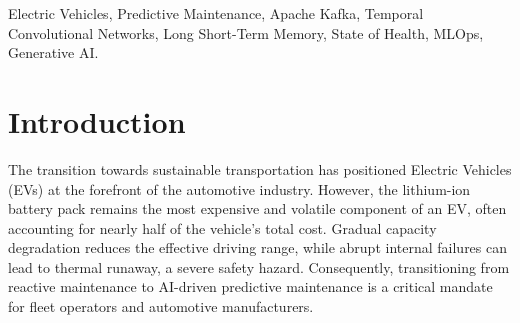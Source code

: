 \maketitle

\begin{abstract}
The rapid proliferation of Electric Vehicles (EVs) necessitates robust Battery Management Systems (BMS) to prevent catastrophic failures and optimize the State of Health (SOH) \cite{b3}. Traditional predictive maintenance pipelines rely on batch-processing orchestrators, which introduce unacceptable latency for critical thermal or degradation events. This paper presents a highly scalable, real-time streaming architecture for EV battery SOH monitoring. By decoupling high-velocity telemetry ingestion from computationally heavy Large Language Model (LLM) workflows, we achieve millisecond-level inference latency. The system utilizes Apache Kafka and Redis streams for stateful data buffering, a dual LSTM/Temporal Convolutional Network (TCN) inference ensemble for continuous SOH prediction, and a LangGraph-orchestrated LLM agent for on-demand, actionable maintenance reporting. A per-battery chronological evaluation shows the LSTM baseline achieving a mean absolute error of 0.0151~Ah ($R^2=0.634$), outperforming the TCN's 0.0206~Ah ($R^2=0.550$) on this dataset, and both models are retained in an averaging ensemble for redundancy. Load testing at 1,000 concurrent users, with the API running 4 Uvicorn worker processes, demonstrated a 0\% failure rate on both core inference endpoints, validating the architecture's viability for enterprise-scale EV fleets.
\end{abstract}

\begin{IEEEkeywords}
Electric Vehicles, Predictive Maintenance, Apache Kafka, Temporal Convolutional Networks, Long Short-Term Memory, State of Health, MLOps, Generative AI.
\end{IEEEkeywords}

\section{\textbf{Introduction}}
The transition towards sustainable transportation has positioned Electric Vehicles (EVs) at the forefront of the automotive industry. However, the lithium-ion battery pack remains the most expensive and volatile component of an EV, often accounting for nearly half of the vehicle's total cost. Gradual capacity degradation reduces the effective driving range, while abrupt internal failures can lead to thermal runaway, a severe safety hazard. Consequently, transitioning from reactive maintenance to AI-driven predictive maintenance is a critical mandate for fleet operators and automotive manufacturers.

